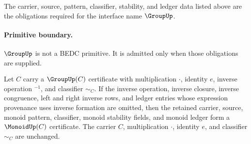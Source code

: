 \begin{definition}
\label{def:group-certificate-obligations}
The carrier, source, pattern, classifier, stability, and ledger data listed above are the obligations required for the interface name \(\GroupUp\).
\end{definition}

\paragraph{Primitive boundary.}
\(\GroupUp\) is not a BEDC primitive. It is admitted only when those obligations are supplied.

\begin{proposition}
\label{prop:group-forgets-monoid-certificate}
Let $C$ carry a $\GroupUp(C)$ certificate with multiplication $\cdot$, identity $e$, inverse operation ${}^{-1}$, and classifier $\sim_C$. If the inverse operation, inverse closure, inverse congruence, left and right inverse rows, and ledger entries whose expression provenance uses inverse formation are omitted, then the retained carrier, source, monoid pattern, classifier, monoid stability fields, and monoid ledger form a $\MonoidUp(C)$ certificate. The carrier $C$, multiplication $\cdot$, identity $e$, and classifier $\sim_C$ are unchanged.
\end{proposition}

